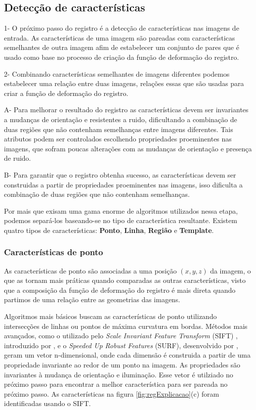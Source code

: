 \subsection{Detecção de características}
\label{sec:dec_corr_carac}

1-  O próximo passo do registro é a detecção de características nas imagens de
entrada. As características de uma imagem são pareadas com características
semelhantes de outra imagem afim de estabelecer um conjunto de pares que é
usado como base no processo de criação da função de deformação do registro.

2- Combinando características semelhantes de imagens diferentes podemos
estabelecer uma relação entre duas imagens, relações essas que são usadas para
criar a função de deformação do registro.

A- Para melhorar o resultado do registro as características devem ser invariantes
a mudanças de orientação e resistentes a ruido, dificultando a combinação de
duas regiões que não contenham semelhanças entre imagens diferentes. Tais
atributos podem ser controlados escolhendo propriedades proeminentes nas
imagens, que sofram poucas alterações com as mudanças de orientação e presença
de ruido.

B- Para garantir que o registro obtenha
sucesso, as características devem ser construidas a partir de propriedades
proeminentes nas imagens, isso dificulta a combinação de duas regiões que não
contenham semelhanças.

Por mais que exisam uma gama enorme de algoritmos utilizados nessa etapa,
podemos separá-los baseando-se no tipo de característica resultante. Existem
quatro tipos de características: \textbf{Ponto}, \textbf{Linha}, \textbf{Região}
e \textbf{Template}.

\subsubsection{Características de ponto}

  As características de ponto são associadas a uma posição $(x, y, z)$ da imagem,
o que as tornam mais práticas quando comparadas as outras características,
visto que a composição da função de deformação do registro é mais direta quando
partimos de uma relação entre as geometrias das imagens.

  Algoritmos mais básicos buscam as características de ponto utilizando
intersecções de linhas ou pontos de máxima curvatura em bordas. Métodos mais
avançados, como o utilizado pelo \textit{Scale Invariant Feature Transform}
(SIFT) , introduzido por \cite{lowe2004distinctive}, e o \textit{Speeded Up Robust Features}
(SURF), desenvolvido por \cite{bay2008speeded}, geram um vetor n-dimensional,
onde cada dimensão é construida a partir de uma propriedade invariante ao redor
de um ponto na imagem. As propriedades são invariantes à mudança de
orientação e iluminação. Esse vetor é utilziado no próximo passo para encontrar
a melhor característica para ser pareada no próximo passo. As características
na figura \ref{fig:regExplicacao}(c) foram identificadas usando o SIFT.

